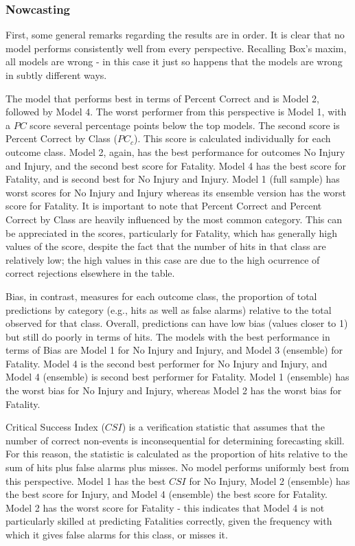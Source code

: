 \documentclass[]{elsarticle} %
\begin{document}
\hypertarget{nowcasting}{%
\subsubsection{Nowcasting}\label{nowcasting}}

First, some general remarks regarding the results are in order. It is
clear that no model performs consistently well from every perspective.
Recalling Box's maxim, all models are wrong - in this case it just so
happens that the models are wrong in subtly different ways.

The model that performs best in terms of Percent Correct and is Model 2,
followed by Model 4. The worst performer from this perspective is Model
1, with a \(PC\) score several percentage points below the top models.
The second score is Percent Correct by Class (\(PC_c\)). This score is
calculated individually for each outcome class. Model 2, again, has the
best performance for outcomes No Injury and Injury, and the second best
score for Fatality. Model 4 has the best score for Fatality, and is
second best for No Injury and Injury. Model 1 (full sample) has worst
scores for No Injury and Injury whereas its ensemble version has the
worst score for Fatality. It is important to note that Percent Correct
and Percent Correct by Class are heavily influenced by the most common
category. This can be appreciated in the scores, particularly for
Fatality, which has generally high values of the score, despite the fact
that the number of hits in that class are relatively low; the high
values in this case are due to the high ocurrence of correct rejections
elsewhere in the table.

Bias, in contrast, measures for each outcome class, the proportion of
total predictions by category (e.g., hits as well as false alarms)
relative to the total observed for that class. Overall, predictions can
have low bias (values closer to 1) but still do poorly in terms of hits.
The models with the best performance in terms of Bias are Model 1 for No
Injury and Injury, and Model 3 (ensemble) for Fatality. Model 4 is the
second best performer for No Injury and Injury, and Model 4 (ensemble)
is second best performer for Fatality. Model 1 (ensemble) has the worst
bias for No Injury and Injury, whereas Model 2 has the worst bias for
Fatality.

Critical Success Index (\(CSI\)) is a verification statistic that
assumes that the number of correct non-events is inconsequential for
determining forecasting skill. For this reason, the statistic is
calculated as the proportion of hits relative to the sum of hits plus
false alarms plus misses. No model performs uniformly best from this
perspective. Model 1 has the best \(CSI\) for No Injury, Model 2
(ensemble) has the best score for Injury, and Model 4 (ensemble) the
best score for Fatality. Model 2 has the worst score for Fatality - this
indicates that Model 4 is not particularly skilled at predicting
Fatalities correctly, given the frequency with which it gives false
alarms for this class, or misses it.
\end{document}
